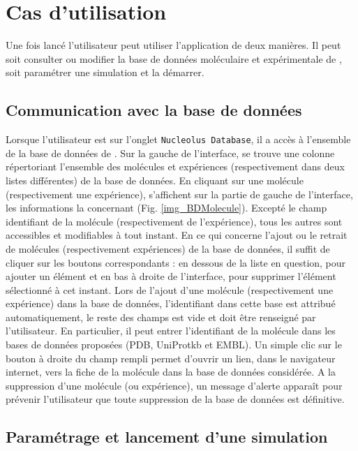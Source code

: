 \chapter{Cas d'utilisation}

Une fois \NQ lancé l'utilisateur peut utiliser l'application de deux
manières. Il peut soit consulter ou modifier la base de données
moléculaire et expérimentale de \NQ, soit paramétrer une simulation et
la démarrer.

\section{Communication avec la base de données}

Lorsque l'utilisateur est sur l'onglet \texttt{Nucleolus Database}, il
a accès à l'ensemble de la base de données de \NQ. Sur la gauche de
l'interface, se trouve une colonne répertoriant l'ensemble des
molécules et expériences (respectivement dans deux listes différentes)
de la base de données. En cliquant sur une molécule (respectivement
une expérience), s'affichent sur la partie de gauche de l'interface,
les informations la concernant (Fig. \ref{img_BDMolecule}). Excepté le
champ identifiant de la molécule (respectivement de l'expérience),
tous les autres sont accessibles et modifiables à tout instant. En ce
qui concerne l'ajout ou le retrait de molécules (respectivement
expériences) de la base de données, il suffit de cliquer sur les
boutons correspondants : en dessous de la liste en question, pour
ajouter un élément et en bas à droite de l'interface, pour supprimer
l'élément sélectionné à cet instant. Lors de l'ajout d'une molécule
(respectivement une expérience) dans la base de données, l'identifiant
dans cette base est attribué automatiquement, le reste des champs est
vide et doit être renseigné par l'utilisateur. En particulier, il peut
entrer l'identifiant de la molécule dans les bases de données
proposées (PDB, UniProtkb et EMBL). Un simple clic sur le bouton à
droite du champ rempli permet d'ouvrir un lien, dans le navigateur
internet, vers la fiche de la molécule dans la base de données
considérée. A la suppression d'une molécule (ou expérience), un
message d'alerte apparaît pour prévenir l'utilisateur que toute
suppression de la base de données est définitive.

\section{Paramétrage et lancement d'une simulation}

